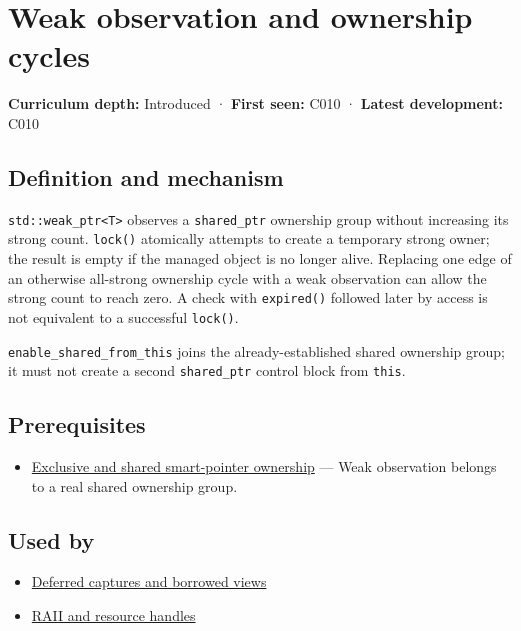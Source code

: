 \hypertarget{appendix-b9548675eb2b}{}\label{referencestart:appendix-b9548675eb2b}
\section{Weak observation and ownership cycles}\label{appendix-b9548675eb2b-weak-observation-and-ownership-cycles}

\textbf{Curriculum depth:} Introduced · \textbf{First seen:} C010 · \textbf{Latest development:} C010

\subsection{Definition and mechanism}\label{appendix-b9548675eb2b-definition-and-mechanism}

\texttt{std::weak\_ptr\textless{}T\textgreater{}} observes a \texttt{shared\_ptr} ownership group without increasing its strong count. \texttt{lock()} atomically attempts to create a temporary strong owner; the result is empty if the managed object is no longer alive. Replacing one edge of an otherwise all-strong ownership cycle with a weak observation can allow the strong count to reach zero. A check with \texttt{expired()} followed later by access is not equivalent to a successful \texttt{lock()}.

\texttt{enable\_shared\_from\_this} joins the already-established shared ownership group; it must not create a second \texttt{shared\_ptr} control block from \texttt{this}.

\subsection{Prerequisites}\label{appendix-b9548675eb2b-prerequisites}

\begin{itemize}
\tightlist
\item
  \hyperref[appendix-51602cabe815]{Exclusive and shared smart-pointer ownership} --- Weak observation belongs to a real shared ownership group.
\end{itemize}

\subsection{Used by}\label{appendix-b9548675eb2b-used-by}

\begin{itemize}
\tightlist
\item
  \hyperref[appendix-aea529eb5175]{Deferred captures and borrowed views}
\item
  \hyperref[appendix-69739d3ab49b]{RAII and resource handles}
\end{itemize}


